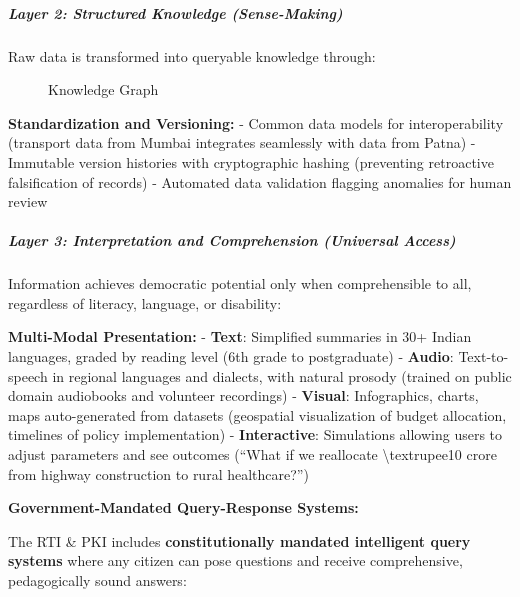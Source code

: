 \subparagraph{Layer 2: Structured Knowledge
(Sense-Making)}\label{layer-2-structured-knowledge-sense-making}

Raw data is transformed into queryable knowledge through:

\begin{figure}
\centering
\pandocbounded{}
\caption{Knowledge Graph}
\end{figure}

\textbf{Standardization and Versioning:} - Common data models for
interoperability (transport data from Mumbai integrates seamlessly with
data from Patna) - Immutable version histories with cryptographic
hashing (preventing retroactive falsification of records) - Automated
data validation flagging anomalies for human review

\subparagraph{Layer 3: Interpretation and Comprehension (Universal
Access)}\label{layer-3-interpretation-and-comprehension-universal-access}

Information achieves democratic potential only when comprehensible to
all, regardless of literacy, language, or disability:

\textbf{Multi-Modal Presentation:} - \textbf{Text}: Simplified summaries
in 30+ Indian languages, graded by reading level (6th grade to
postgraduate) - \textbf{Audio}: Text-to-speech in regional languages and
dialects, with natural prosody (trained on public domain audiobooks and
volunteer recordings) - \textbf{Visual}: Infographics, charts, maps
auto-generated from datasets (geospatial visualization of budget
allocation, timelines of policy implementation) - \textbf{Interactive}:
Simulations allowing users to adjust parameters and see outcomes (``What
if we reallocate \textbackslash textrupee10 crore from highway
construction to rural healthcare?'')

\textbf{Government-Mandated Query-Response Systems:}

The RTI \& PKI includes \textbf{constitutionally mandated intelligent
query systems} where any citizen can pose questions and receive
comprehensive, pedagogically sound answers:

